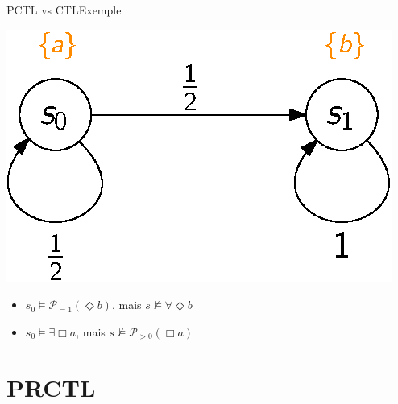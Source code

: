 \documentclass[compress]{beamer}
\begin{document}
\begin{frame}{PCTL vs CTL}{Exemple}
  \begin{center}
    \includegraphics[width=0.5\linewidth]{resources/PCTL_CTL}
  \end{center}
  \begin{itemize}
    \item $s_0 \models \mathcal{P}_{=1}(\Diamond b)$, mais $s \not \models \forall \Diamond b$
    \item $s_0 \models \exists \Box a$, mais $s \not \models \mathcal{P}_{>0}(\Box a)$
  \end{itemize}
\end{frame}

\section{PRCTL}
\end{document}
